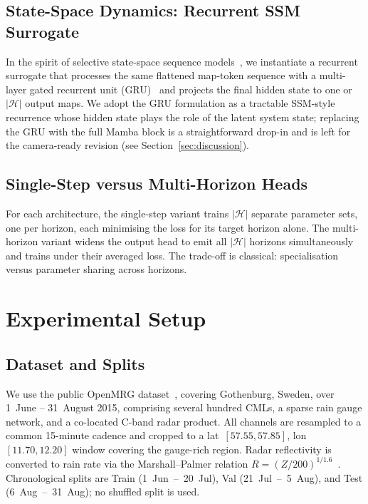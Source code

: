 \documentclass[conference]{IEEEtran}
\begin{document}
\subsection{State-Space Dynamics: Recurrent SSM Surrogate}

In the spirit of selective state-space sequence
models~\cite{gu2023mamba}, we instantiate a recurrent surrogate that
processes the same flattened map-token sequence with a multi-layer gated
recurrent unit (GRU)~\cite{cho2014gru} and projects the final hidden
state to one or $|\mathcal{H}|$ output maps. We adopt the GRU formulation
as a tractable SSM-style recurrence whose hidden state plays the role of
the latent system state; replacing the GRU with the full
Mamba block is a straightforward drop-in and is left for the camera-ready
revision (see Section~\ref{sec:discussion}).

\subsection{Single-Step versus Multi-Horizon Heads}

For each architecture, the single-step variant trains $|\mathcal{H}|$
separate parameter sets, one per horizon, each minimising the loss for
its target horizon alone. The multi-horizon variant widens the output
head to emit all $|\mathcal{H}|$ horizons simultaneously and trains
under their averaged loss. The trade-off is classical: specialisation
versus parameter sharing across horizons.

\section{Experimental Setup}
\label{sec:setup}

\subsection{Dataset and Splits}

We use the public OpenMRG
dataset~\cite{andersson2022openmrg}, covering Gothenburg, Sweden, over
1~June -- 31~August 2015, comprising several hundred CMLs, a sparse rain
gauge network, and a co-located C-band radar product. All channels are
resampled to a common 15-minute cadence and cropped to a
lat~$[57.55, 57.85]$, lon~$[11.70, 12.20]$ window covering the
gauge-rich region. Radar reflectivity is converted to rain rate via the
Marshall--Palmer relation
$R=(Z/200)^{1/1.6}$~\cite{marshall1948}. Chronological splits are
Train (1~Jun~--~20~Jul), Val (21~Jul~--~5~Aug), and Test
(6~Aug~--~31~Aug); no shuffled split is used.
\end{document}
